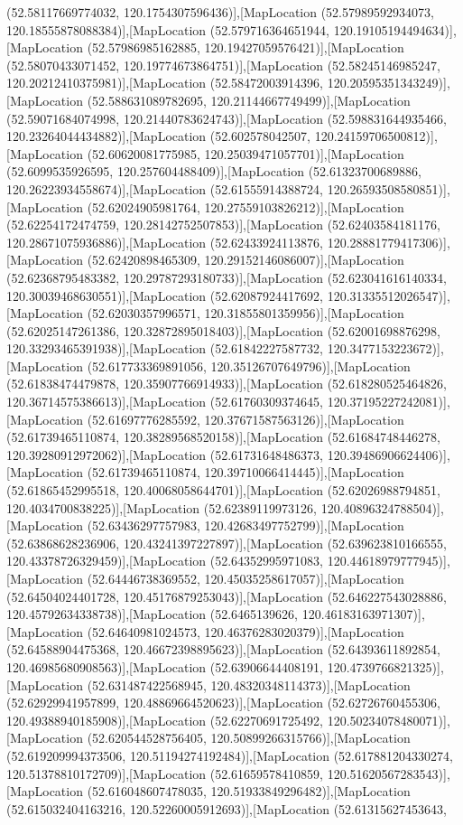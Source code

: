 (52.58117669774032, 120.1754307596436)],[MapLocation (52.57989592934073, 120.18555878088384)],[MapLocation (52.579716364651944, 120.19105194494634)],[MapLocation (52.57986985162885, 120.19427059576421)],[MapLocation (52.58070433071452, 120.19774673864751)],[MapLocation (52.58245146985247, 120.20212410375981)],[MapLocation (52.58472003914396, 120.20595351343249)],[MapLocation (52.588631089782695, 120.21144667749499)],[MapLocation (52.59071684074998, 120.21440783624743)],[MapLocation (52.598831644935466, 120.23264044434882)],[MapLocation (52.602578042507, 120.24159706500812)],[MapLocation (52.60620081775985, 120.25039471057701)],[MapLocation (52.6099535926595, 120.257604488409)],[MapLocation (52.61323700689886, 120.26223934558674)],[MapLocation (52.61555914388724, 120.26593508580851)],[MapLocation (52.62024905981764, 120.27559103826212)],[MapLocation (52.62254172474759, 120.28142752507853)],[MapLocation (52.62403584181176, 120.28671075936886)],[MapLocation (52.62433924113876, 120.28881779417306)],[MapLocation (52.62420898465309, 120.29152146086007)],[MapLocation (52.62368795483382, 120.29787293180733)],[MapLocation (52.623041616140334, 120.30039468630551)],[MapLocation (52.62087924417692, 120.31335512026547)],[MapLocation (52.62030357996571, 120.31855801359956)],[MapLocation (52.62025147261386, 120.32872895018403)],[MapLocation (52.62001698876298, 120.33293465391938)],[MapLocation (52.61842227587732, 120.3477153223672)],[MapLocation (52.617733369891056, 120.35126707649796)],[MapLocation (52.61838474479878, 120.35907766914933)],[MapLocation (52.618280525464826, 120.36714575386613)],[MapLocation (52.61760309374645, 120.37195227242081)],[MapLocation (52.61697776285592, 120.37671587563126)],[MapLocation (52.61739465110874, 120.38289568520158)],[MapLocation (52.61684748446278, 120.39280912972062)],[MapLocation (52.61731648486373, 120.39486906624406)],[MapLocation (52.61739465110874, 120.39710066414445)],[MapLocation (52.61865452995518, 120.40068058644701)],[MapLocation (52.62026988794851, 120.4034700838225)],[MapLocation (52.62389119973126, 120.40896324788504)],[MapLocation (52.63436297757983, 120.42683497752799)],[MapLocation (52.63868628236906, 120.43241397227897)],[MapLocation (52.639623810166555, 120.43378726329459)],[MapLocation (52.64352995971083, 120.44618979777945)],[MapLocation (52.64446738369552, 120.45035258617057)],[MapLocation (52.64504024401728, 120.45176879253043)],[MapLocation (52.646227543028886, 120.45792634338738)],[MapLocation (52.6465139626, 120.46183163971307)],[MapLocation (52.64640981024573, 120.46376283020379)],[MapLocation (52.64588904475368, 120.46672398895623)],[MapLocation (52.64393611892854, 120.46985680908563)],[MapLocation (52.63906644408191, 120.4739766821325)],[MapLocation (52.631487422568945, 120.48320348114373)],[MapLocation (52.62929941957899, 120.48869664520623)],[MapLocation (52.62726760455306, 120.49388940185908)],[MapLocation (52.62270691725492, 120.50234078480071)],[MapLocation (52.620544528756405, 120.50899266315766)],[MapLocation (52.619209994373506, 120.51194274192484)],[MapLocation (52.617881204330274, 120.51378810172709)],[MapLocation (52.61659578410859, 120.51620567283543)],[MapLocation (52.616048607478035, 120.51933849296482)],[MapLocation (52.615032404163216, 120.52260005912693)],[MapLocation (52.61315627453643, 